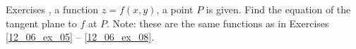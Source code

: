 {\noindent Exercises}
{, a function $z=f(x,y)$,  a point $P$ is given. Find the equation of the tangent plane to $f$ at $P$. Note: these are the same functions as in  Exercises \ref{12_06_ex_05} -- \ref{12_06_ex_08}.
}
